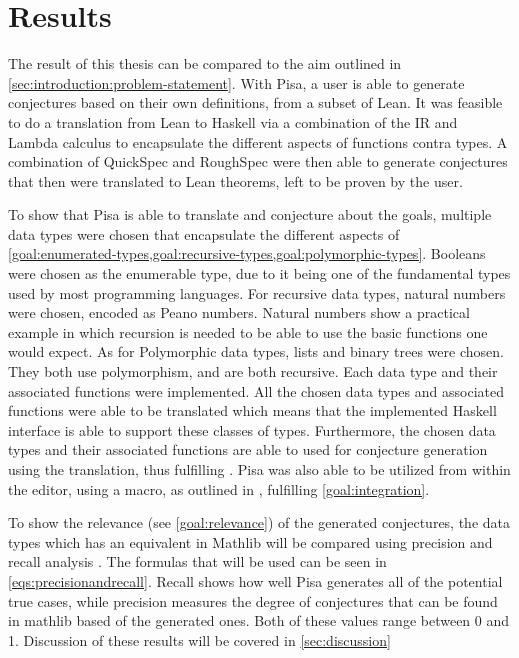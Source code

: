 \chapter{Results}\label{chp:results}
The result of this thesis can be compared to the aim outlined in \cref{sec:introduction:problem-statement}.
With Pisa, a user is able to generate conjectures based on their own definitions, from a subset of Lean.
It was feasible to do a translation from Lean to Haskell via a combination of the IR and Lambda calculus to encapsulate the different aspects of functions contra types.
A combination of QuickSpec and RoughSpec were then able to generate conjectures that then were translated to Lean theorems, left to be proven by the user.

To show that Pisa is able to translate and conjecture about the goals, multiple data types were chosen that encapsulate the different aspects of \cref{goal:enumerated-types,goal:recursive-types,goal:polymorphic-types}.
Booleans were chosen as the enumerable type, due to it being one of the fundamental types used by most programming languages.
For recursive data types, natural numbers were chosen, encoded as Peano numbers.
Natural numbers show a practical example in which recursion is needed to be able to use the basic functions one would expect.
As for Polymorphic data types, lists and binary trees were chosen.
They both use polymorphism, and are both recursive.
Each data type and their associated functions were implemented.
All the chosen data types and associated functions were able to be translated which means that the implemented Haskell interface is able to support these classes of types.
Furthermore, the chosen data types and their associated functions are able to used for conjecture generation using the translation, thus fulfilling .
Pisa was also able to be utilized from within the editor, using a macro, as outlined in , fulfilling \cref{goal:integration}.

To show the relevance (see \cref{goal:relevance}) of the generated conjectures, the data types which has an equivalent in Mathlib \autocite{Mathlib4} will be compared using precision and recall analysis \autocite{PrecisionAndRecall}.
The formulas that will be used can be seen in \cref{eqs:precisionandrecall}.
Recall shows how well Pisa generates all of the potential true cases, while precision measures the degree of conjectures that can be found in mathlib based of the generated ones.
Both of these values range between 0 and 1.
Discussion of these results will be covered in \cref{sec:discussion}

